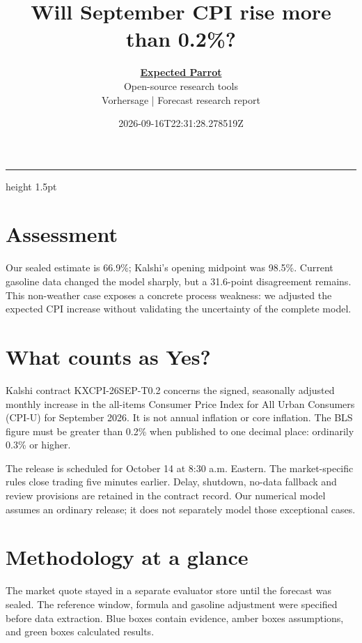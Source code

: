 \documentclass[11pt]{article}
\title{Will September CPI rise more than 0.2\%?}
\author{\href{https://www.expectedparrot.com/}{\textcolor{epgreen}{\textbf{Expected Parrot}}}\\{\small Open-source research tools}\\[4pt]{\small Vorhersage | Forecast research report}}
\date{2026-09-16T22:31:28.278519Z}
\begin{document}
\maketitle
{\color{epgreen}\hrule height 1.5pt}\vspace{8pt}
\section*{\textcolor{epdarkgreen}{Assessment}}
Our sealed estimate is 66.9\%; Kalshi’s opening midpoint was 98.5\%. Current gasoline data changed the model sharply, but a 31.6-point disagreement remains. This non-weather case exposes a concrete process weakness: we adjusted the expected CPI increase without validating the uncertainty of the complete model.


\section*{\textcolor{epdarkgreen}{What counts as Yes?}}
Kalshi contract KXCPI-26SEP-T0.2 concerns the signed, seasonally adjusted monthly increase in the all-items Consumer Price Index for All Urban Consumers (CPI-U) for September 2026. It is not annual inflation or core inflation. The BLS figure must be greater than 0.2\% when published to one decimal place: ordinarily 0.3\% or higher.


The release is scheduled for October 14 at 8:30 a.m. Eastern. The market-specific rules close trading five minutes earlier. Delay, shutdown, no-data fallback and review provisions are retained in the contract record. Our numerical model assumes an ordinary release; it does not separately model those exceptional cases.


\clearpage
\section*{\textcolor{epdarkgreen}{Methodology at a glance}}
The market quote stayed in a separate evaluator store until the forecast was sealed. The reference window, formula and gasoline adjustment were specified before data extraction. Blue boxes contain evidence, amber boxes assumptions, and green boxes calculated results.
\end{document}
